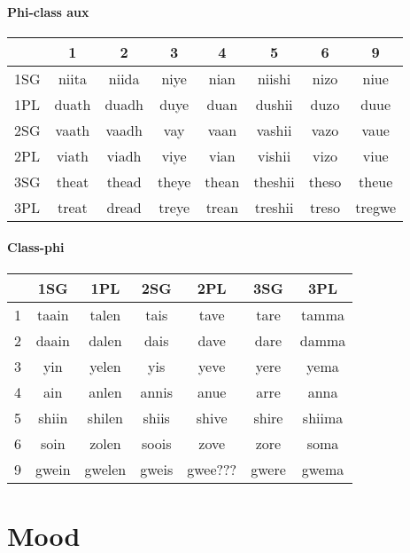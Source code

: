 \documentclass[8pt]{book}
\begin{document}
\paragraph{Phi-class aux}
\begin{center}
	\begin{tabular}{|l|c|c|c|c|c|c|c|}
	\hline
	& 1 & 2 & 3 & 4 & 5 & 6 & 9 \\ \hline
    1SG & niita & niida & niye & nian & niishi & nizo & niue  \\ \hline
    1PL & duath & duadh & duye & duan & dushii & duzo & duue \\ \hline 
    2SG & vaath & vaadh & vay & vaan & vashii & vazo & vaue \\ \hline
    2PL & viath & viadh & viye & vian & vishii & vizo & viue \\ \hline
  	3SG & theat & thead & theye & thean & theshii & theso & theue \\ \hline
  	3PL & treat & dread & treye & trean & treshii & treso & tregwe \\ \hline
	\end{tabular}
\end{center}

\paragraph{Class-phi}
\begin{center}
	\begin{tabular}{|l|c|c|c|c|c|c|}
	  \hline
      & 1SG & 1PL & 2SG & 2PL & 3SG & 3PL \\ \hline
      1 & taain & talen & tais & tave & tare & tamma  \\ \hline
      2 & daain & dalen & dais & dave & dare & damma \\ \hline
      3 & yin  & yelen & yis & yeve & yere & yema \\ \hline
      4 & ain & anlen & annis & anue & arre & anna \\ \hline
      5 & shiin & shilen & shiis & shive & shire  & shiima\\ \hline
      6 & soin & zolen & soois & zove & zore & soma \\ \hline
      9 & gwein & gwelen & gweis & gwee??? & gwere & gwema\\ \hline
      \end{tabular}
\end{center}

\section{Mood}
\end{document}
